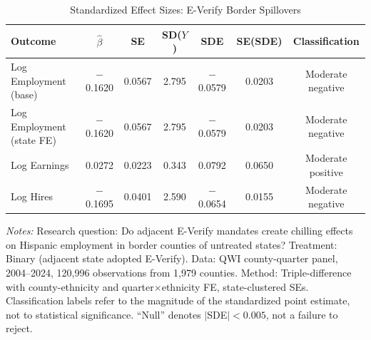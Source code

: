 \begin{table}[H]
\centering
\caption{Standardized Effect Sizes: E-Verify Border Spillovers}
\label{tab:sde}
\footnotesize
\begin{tabular}{lcccccc}
\toprule
Outcome & $\hat{\beta}$ & SE & SD($Y$) & SDE & SE(SDE) & Classification \\
\midrule
Log Employment (base) & $-$0.1620 & 0.0567 & 2.795 & $-$0.0579 & 0.0203 & Moderate negative \\
Log Employment (state FE) & $-$0.1620 & 0.0567 & 2.795 & $-$0.0579 & 0.0203 & Moderate negative \\
Log Earnings & 0.0272 & 0.0223 & 0.343 & 0.0792 & 0.0650 & Moderate positive \\
Log Hires & $-$0.1695 & 0.0401 & 2.590 & $-$0.0654 & 0.0155 & Moderate negative \\
\bottomrule
\end{tabular}
\par\vspace{0.3em}
{\footnotesize \textit{Notes:} Research question: Do adjacent E-Verify mandates
create chilling effects on Hispanic employment in border counties of untreated
states? Treatment: Binary (adjacent state adopted E-Verify). Data: QWI
county-quarter panel, 2004--2024, 120,996 observations from 1,979 counties.
Method: Triple-difference with county-ethnicity and quarter$\times$ethnicity FE,
state-clustered SEs. Classification labels refer to the magnitude of the
standardized point estimate, not to statistical significance. ``Null'' denotes
$|$SDE$| < 0.005$, not a failure to reject.}
\end{table}
